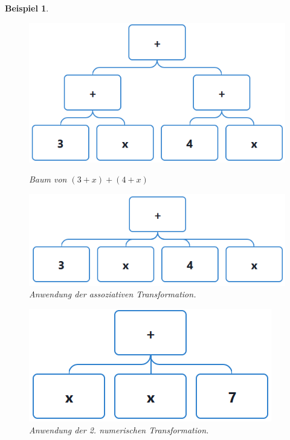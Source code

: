 \documentclass[11pt]{article}
\newtheorem{example}{Beispiel}
\begin{document}
\begin{example}
  \begin{figure}[h]
    \begin{minipage}{.5\textwidth}
      \centering
      \includegraphics[scale=0.45]{trees/sum/beispiel_1_1.png}
      \caption{Baum von $(3+x)+(4+x)$}
    \end{minipage}
    \begin{minipage}{.5\textwidth}
      \centering
      \includegraphics[scale=0.45]{trees/sum/beispiel_1_2.png}
      \caption{Anwendung der assoziativen Transformation.}
    \end{minipage}
  \end{figure}
  \begin{figure}[h]
    \begin{minipage}{.5\textwidth}
      \centering
      \includegraphics[scale=0.45]{trees/sum/beispiel_1_3.png}
      \caption{Anwendung der 2. numerischen Transformation.}

\end{minipage}
\end{figure}
\end{example}
\end{document}
